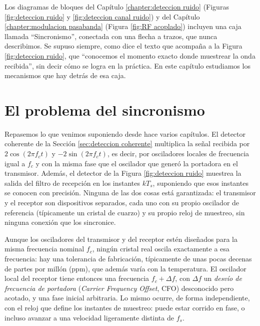 Los diagramas de bloques del Capítulo \ref{chapter:deteccion ruido} (Figuras \ref{fig:deteccion ruido} y \ref{fig:deteccion canal ruido}) y del Capítulo \ref{chapter:modulacion pasabanda} (Figura \ref{fig:RF acoplado}) incluyen una caja llamada ``Sincronismo'', conectada con una flecha a trazos, que nunca describimos. Se supuso siempre, como dice el texto que acompaña a la Figura \ref{fig:deteccion ruido}, que ``conocemos el momento exacto donde muestrear la onda recibida'', sin decir cómo se logra en la práctica. En este capítulo estudiamos los mecanismos que hay detrás de esa caja.

\section{El problema del sincronismo}\label{sec:problema sincronismo}

Repasemos lo que venimos suponiendo desde hace varios capítulos. El detector coherente de la Sección \ref{sec:deteccion coherente} multiplica la señal recibida por $2\cos(2\pi f_c t)$ y $-2\sin(2\pi f_c t)$, es decir, por osciladores locales de frecuencia igual a $f_c$ y con la misma fase que el oscilador que generó la portadora en el transmisor. Además, el detector de la Figura \ref{fig:deteccion ruido} muestrea la salida del filtro de recepción en los instantes $kT_s$, suponiendo que esos instantes se conocen con precisión. Ninguna de las dos cosas está garantizada: el transmisor y el receptor son dispositivos separados, cada uno con su propio oscilador de referencia (típicamente un cristal de cuarzo) y su propio reloj de muestreo, sin ninguna conexión que los sincronice.

Aunque los osciladores del transmisor y del receptor estén diseñados para la misma frecuencia nominal $f_c$, ningún cristal real oscila exactamente a esa frecuencia: hay una tolerancia de fabricación, típicamente de unas pocas decenas de partes por millón (ppm), que además varía con la temperatura. El oscilador local del receptor tiene entonces una frecuencia $f_c+\Delta f$, con $\Delta f$ un \emph{desvío de frecuencia de portadora} (\emph{Carrier Frequency Offset}, CFO) desconocido pero acotado, y una fase inicial arbitraria. Lo mismo ocurre, de forma independiente, con el reloj que define los instantes de muestreo: puede estar corrido en fase, o incluso avanzar a una velocidad ligeramente distinta de $f_s$.

